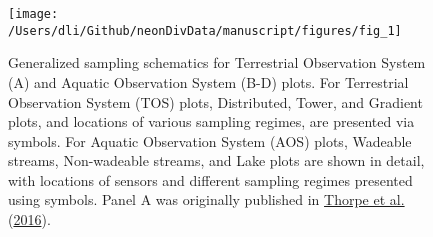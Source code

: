 \documentclass[
  12pt,
]{article}
\begin{document}
\begin{figure}

{\centering \texttt{[image: /Users/dli/Github/neonDivData/manuscript/figures/fig\_1]} 

}

\caption{Generalized sampling schematics for Terrestrial Observation System (A) and Aquatic Observation System (B-D) plots. For Terrestrial Observation System (TOS) plots, Distributed, Tower, and Gradient plots, and locations of various sampling regimes, are presented via symbols. For Aquatic Observation System (AOS) plots, Wadeable streams, Non-wadeable streams, and Lake plots are shown in detail, with locations of sensors and different sampling regimes presented using symbols. Panel A was originally published in \protect\hyperlink{ref-thorpe2016introduction}{Thorpe et al.} (\protect\hyperlink{ref-thorpe2016introduction}{2016}).}\label{fig:Fig1Design}
\end{figure}
\end{document}
